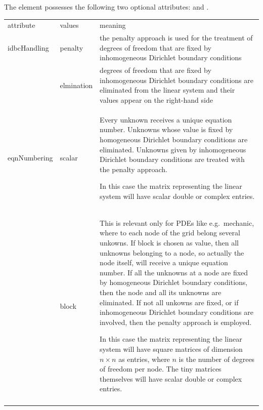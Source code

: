 The  element possesses the following two optional attributes:
 and .
\begin{center}
\begin{longtable}{llp{}}
\hline\noalign{\smallskip}
attribute & values & meaning \\
\noalign{\smallskip}\hline\noalign{\smallskip}
idbcHandling & penalty    & the penalty approach is used for the treatment of
                            degrees of freedom that are fixed by inhomogeneous
                            Dirichlet boundary conditions\\
             & elmination & degrees of freedom that are fixed by inhomogeneous
                            Dirichlet boundary conditions are eliminated from
                            the linear system and their values appear on the
                            right-hand side\\
\noalign{\smallskip}\hline\noalign{\smallskip}
eqnNumbering & scalar & Every unknown receives a unique equation number.
                        Unknowns whose value is fixed by homogeneous Dirichlet
                        boundary conditions are eliminated. Unknowns given by
                        inhomogeneous Dirichlet boundary conditions are treated
                        with the penalty approach.

                        In this case the matrix representing the linear system
                        will have scalar double or complex entries.\\
             & block  & This is relevant only for PDEs like e.g.~mechanic,
                        where to each node of the grid belong several unkowns.
                        If block is chosen as value, then all unknowns
                        belonging to a node, so actually the node itself, will
                        receive a unique equation number. If all the unknowns
                        at a node are fixed by homogeneous Dirichlet boundary
                        conditions, then the node and all its unknowns are
                        eliminated. If not all unkowns are fixed, or if
                        inhomogeneous Dirichlet boundary conditions are
                        involved, then the penalty approach is employed.

                        In this case the matrix representing the linear system
                        will have square matrices of dimension $n\times n$ as
                        entries, where $n$ is the number of degrees of freedom
                        per node. The tiny matrices themselves will have scalar
                        double or complex entries.\\
\noalign{\smallskip}\hline
\end{longtable}
\end{center}
